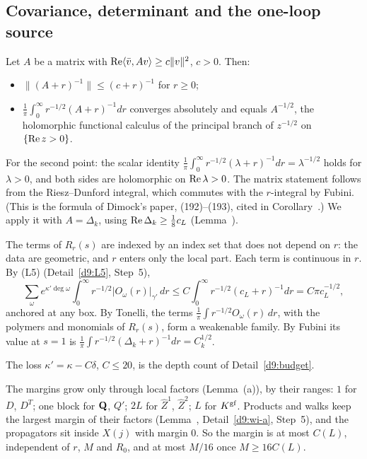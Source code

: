 \subsection{Covariance, determinant and the one-loop source}\label{d9:cov}

\begin{detail}\label{d9:cov-cor}
\begin{step}
Let $A$ be a matrix with $\operatorname{Re}\langle \bar v,Av\rangle\ge c\|v\|^2$, $c>0$. Then:
\begin{itemize}
\item $\|(A+r)^{-1}\|\le(c+r)^{-1}$ for $r\ge0$;
\item $\frac1\pi\int_0^\infty r^{-1/2}(A+r)^{-1}dr$ converges absolutely and equals $A^{-1/2}$, the holomorphic functional calculus of the principal branch of $z^{-1/2}$ on $\{\operatorname{Re} z>0\}$.
\end{itemize}
For the second point: the scalar identity $\frac1\pi\int_0^\infty r^{-1/2}(\lambda+r)^{-1}dr=\lambda^{-1/2}$ holds for $\lambda>0$, and both sides are holomorphic on $\operatorname{Re}\lambda>0$. The matrix statement follows from the Riesz--Dunford integral, which commutes with the $r$-integral by Fubini. (This is the formula of Dimock's paper, (192)--(193), cited in Corollary~.) We apply it with $A=\Delta_k$, using $\operatorname{Re}\Delta_k\ge\frac18c_L$ (Lemma~).

The terms of $R_r(s)$ are indexed by an index set that does not depend on $r$: the data are geometric, and $r$ enters only the local part. Each term is continuous in $r$. By (L5) (Detail~\ref{d9:L5}, Step~5),
\[
\sum_\omega e^{\kappa'\deg\omega}\int_0^\infty r^{-1/2}|O_\omega(r)|_{\gamma'}\,dr\le C\int_0^\infty r^{-1/2}(c_L+r)^{-1}dr=C\pi c_L^{-1/2},
\]
anchored at any box. By Tonelli, the terms $\frac1\pi\int r^{-1/2}O_\omega(r)\,dr$, with the polymers and monomials of $R_r(s)$, form a weakenable family. By Fubini its value at $s=1$ is $\frac1\pi\int r^{-1/2}(\Delta_k+r)^{-1}dr=C_k^{1/2}$.
\end{step}
\begin{step}
The loss $\kappa'=\kappa-C\delta$, $C\le20$, is the depth count of Detail~\ref{d9:budget}.

The margins grow only through local factors (Lemma~(a)), by their ranges: $1$ for $D$, $D^T$; one block for $\mathbf Q$, $Q'$; $2L$ for $\hat Z^1$, $\hat Z^2$; $L$ for $K^{\rm gf}$. Products and walks keep the largest margin of their factors (Lemma~, Detail~\ref{d9:wi-a}, Step~5), and the propagators sit inside $X(j)$ with margin $0$. So the margin is at most $C(L)$, independent of $r$, $M$ and $R_0$, and at most $M/16$ once $M\ge16C(L)$.


\end{step}
\end{detail}
